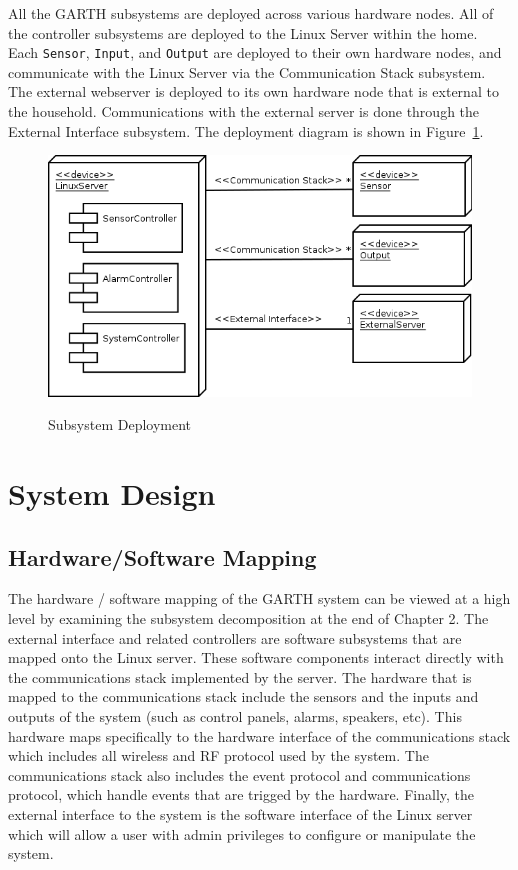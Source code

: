 \documentclass{report}
\begin{document}
All the GARTH subsystems are deployed across various hardware
nodes. All of the controller subsystems are deployed to the Linux
Server within the home. Each \texttt{Sensor}, \texttt{Input}, and
\texttt{Output} are deployed to their own hardware nodes, and
communicate with the Linux Server via the Communication Stack
subsystem. The external webserver is deployed to its own hardware node
that is external to the household. Communications with the external
server is done through the External Interface subsystem. The
deployment diagram is shown in Figure~\ref{fig:subsystem_deployment}.

\begin{figure}[hp]
  \centering
  \caption{Subsystem Deployment}
  \includegraphics[scale=0.5]{deployment.png}
  \label{fig:subsystem_deployment}
\end{figure}

\chapter{System Design} %
\label{ch:system-design}

\section{Hardware/Software Mapping}

The hardware / software mapping of the GARTH system can be viewed at a high
level by examining the subsystem decomposition at the end of Chapter 2. The
external interface and related controllers are software subsystems that are
mapped onto the Linux server. These software components interact directly with
the communications stack implemented by the server. The hardware that is mapped
to the communications stack include the sensors and the inputs and outputs of
the system (such as control panels, alarms, speakers, etc). This hardware maps
specifically to the hardware interface of the communications stack which
includes all wireless and RF protocol used by the system. The communications
stack also includes the event protocol and communications protocol, which
handle events that are trigged by the hardware. Finally, the external interface
to the system is the software interface of the Linux server which will allow a
user with admin privileges to configure or manipulate the system.
\end{document}
